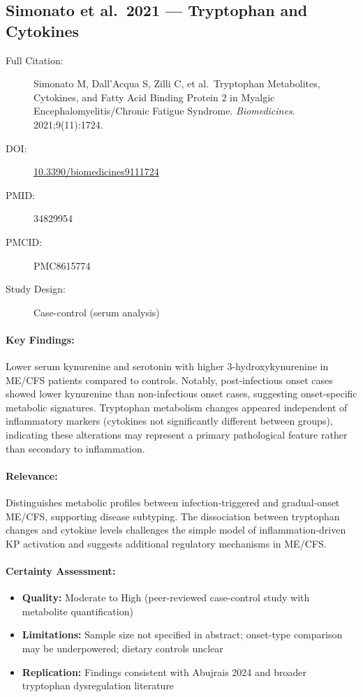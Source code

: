 \subsection{Simonato et al.\ 2021 --- Tryptophan and Cytokines}

\begin{description}
    \item[Full Citation:] Simonato M, Dall'Acqua S, Zilli C, et al.\ Tryptophan Metabolites, Cytokines, and Fatty Acid Binding Protein 2 in Myalgic Encephalomyelitis/Chronic Fatigue Syndrome. \textit{Biomedicines}. 2021;9(11):1724.
    \item[DOI:] \href{https://doi.org/10.3390/biomedicines9111724}{10.3390/biomedicines9111724}
    \item[PMID:] 34829954
    \item[PMCID:] PMC8615774
    \item[Study Design:] Case-control (serum analysis)
\end{description}

\paragraph{Key Findings:}
Lower serum kynurenine and serotonin with higher 3-hydroxykynurenine in ME/CFS patients compared to controls. Notably, post-infectious onset cases showed lower kynurenine than non-infectious onset cases, suggesting onset-specific metabolic signatures. Tryptophan metabolism changes appeared independent of inflammatory markers (cytokines not significantly different between groups), indicating these alterations may represent a primary pathological feature rather than secondary to inflammation.

\paragraph{Relevance:}
Distinguishes metabolic profiles between infection-triggered and gradual-onset ME/CFS, supporting disease subtyping. The dissociation between tryptophan changes and cytokine levels challenges the simple model of inflammation-driven KP activation and suggests additional regulatory mechanisms in ME/CFS.

\paragraph{Certainty Assessment:}
\begin{itemize}
    \item \textbf{Quality:} Moderate to High (peer-reviewed case-control study with metabolite quantification)
    \item \textbf{Limitations:} Sample size not specified in abstract; onset-type comparison may be underpowered; dietary controls unclear
    \item \textbf{Replication:} Findings consistent with Abujrais 2024 and broader tryptophan dysregulation literature
\end{itemize}

